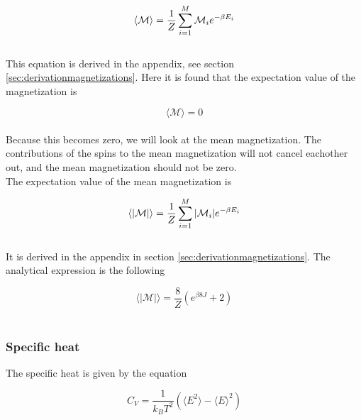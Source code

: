 \documentclass{article}
\begin{document}
\begin{equation}    \label{eq:magnetization}
    \langle \mathcal{M} \rangle = \frac{1}{Z} \sum _{i=1} ^M \mathcal{M}_i e^{- \beta E_i} \\
\end{equation} \\

This equation is derived in the appendix, see section \ref{sec:derivationmagnetizations}. Here it is found that the expectation value of the magnetization is

\begin{equation} \label{eq:finalmagnetization}
    \langle \mathcal{M} \rangle = 0
\end{equation} \\

Because this becomes zero, we will look at the mean magnetization. The contributions of the spins to the mean magnetization will not cancel eachother out, and the mean magnetization should not be zero. \\

The expectation value of the mean magnetization is

\begin{equation}    \label{eq:meanmagnetization}
    \langle |\mathcal{M}| \rangle = \frac{1}{Z} \sum _{i=1} ^M |\mathcal{M}_i| e^{- \beta E_i} \\
\end{equation} \\

It is derived in the appendix in section \ref{sec:derivationmagnetizations}. The analytical expression is the following

\begin{equation} \label{eq:finalmeanmagnetization}
    \langle | \mathcal{M} | \rangle = \frac{8}{Z} \left( e^{\beta 8J} + 2 \right)
\end{equation} \\


\subsubsection{Specific heat} \label{sec:specificheat}

The specific heat is given by the equation

\begin{equation}    \label{eq:specificheat}
    C_V = \frac{1}{k_B T^2} \left( \langle E^2 \rangle - \langle E \rangle ^2 \right)
\end{equation} \\
\end{document}
